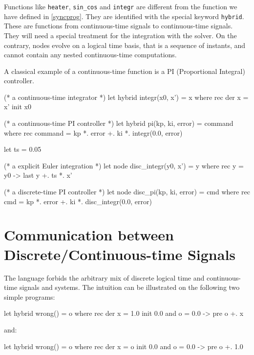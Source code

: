 \documentclass[11pt,titlepage,twoside]{report}
\newcommand{\Marc}[1]{{\bf Marc.} {#1} {\bf Fin}}
\newcommand{\Tim}[1]{{\bf Tim.} {#1} {\bf Fin}}
\begin{document}
\medskip Functions like \verb+heater+, \verb+sin_cos+ and
\verb+integr+ are different from the function we have defined in
\cref{syncprog}. They are identified
with the special keyword \texttt{hybrid}. These are functions from
continuous-time signals to continuous-time signals. They will need a
special treatment for the integration with the solver. On the
contrary, nodes evolve on a logical time basis, that is a sequence of
instants, and cannot contain any nested continuous-time computations.

A classical example of a continuous-time function is a PI
(Proportional Integral) controller.
\begin{chklisting}[withresult]
(* a continuous-time integrator *)
let hybrid integr(x0, x') = x where
  rec der x = x' init x0

(* a continuous-time PI controller *)
let hybrid pi(kp, ki, error) = command where
  rec command = kp *. error +. ki *. integr(0.0, error) 

let ts = 0.05

(* a explicit Euler integration *)
let node disc_integr(y0, x') = y where
  rec y = y0 -> last y +. ts *. x'

(* a discrete-time PI controller *)
let node disc_pi(kp, ki, error) = cmd where
  rec cmd = kp *. error +. ki *. disc_integr(0.0, error)
\end{chklisting}

\section{Communication between Discrete/Continuous-time Signals\label{commdisccont}} %

The language forbids the arbitrary mix of discrete logical time and
continuous-time signals and systems. The intuition can be illustrated
on the following two simple programs:
\begin{chklisting}[fail]
let hybrid wrong() = o where
  rec der x = 1.0 init 0.0
  and o = 0.0 -> pre o +. x
\end{chklisting}
and:
\begin{chklisting}[fail]
let hybrid wrong() = o where
  rec der x = o init 0.0
  and o = 0.0 -> pre o +. 1.0
\end{chklisting}

\end{document}
